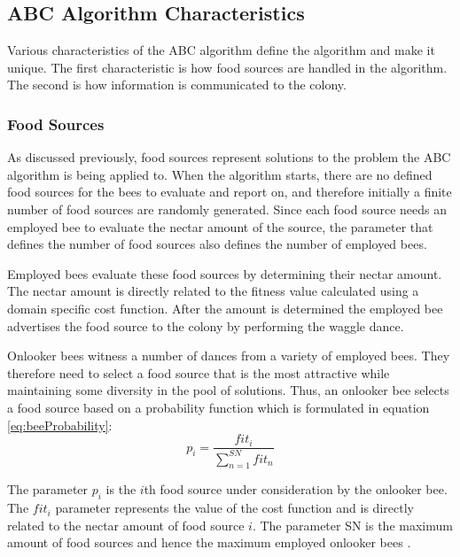\subsection{ABC Algorithm Characteristics}
Various characteristics of the \gls{ABC} algorithm define the algorithm and make it unique. The first characteristic is how food sources are handled in the algorithm. The second is how information is communicated to the colony.
\subsubsection{Food Sources}
\label{sec:foodsources}
As discussed previously, food sources represent solutions to the problem the \gls{ABC} algorithm is being applied to. When the algorithm starts, there are no defined food sources for the bees to evaluate and report on, and therefore initially a finite number of food sources are randomly generated\cite{ABCCompareStudy,ABCFusionGrid}. Since each food source needs an employed bee to evaluate the nectar amount of the source, the parameter that defines the number of food sources also defines the number of employed bees\cite{ABCCompareStudy,ABCLeafConstrained}.

Employed bees evaluate these food sources by determining their nectar amount\cite{ABCCompareStudy,ABCLeafConstrained}. The nectar amount is directly related to the fitness value calculated using a domain specific cost function\cite{ABCCompareStudy,ABCReconfigDistro}. After the amount is determined the employed bee advertises the food source to the colony by performing the waggle dance.

Onlooker bees witness a number of dances from a variety of employed bees\cite{ABCFusionGrid,BeeJobShop}. They therefore need to select a food source that is the most attractive while maintaining some diversity in the pool of solutions. Thus, an onlooker bee selects a food source based on a probability function which is formulated in equation \ref{eq:beeProbability}\cite{ABCCompareStudy}:
\begin{equation}
\label{eq:beeProbability}
p_i = \frac{{fit}_i}{\sum^{SN}_{n=1}{fit}_n}
\end{equation}

The parameter $p_i$ is the $i$th food source under consideration by the onlooker bee. The ${fit}_i$ parameter represents the value of the cost function and is directly related to the nectar amount of food source $i$. The parameter SN is the maximum amount of food sources and hence the maximum employed onlooker bees \cite{ABCCompareStudy}.

